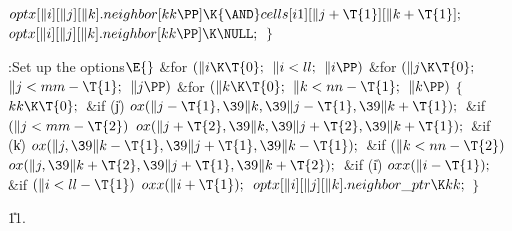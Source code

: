 ${}\\{optx}[\|i][\|j][\|k].\\{neighbor}[\\{kk}\PP]\K{\AND}\\{cells}[\\{i1}][%
\|j+\T{1}][\|k+\T{1}];{}$\6
${}\\{optx}[\|i][\|j][\|k].\\{neighbor}[\\{kk}\PP]\K\NULL;{}$\6
\4${}\}{}$\2\par
\Y\B\4:Set up the  options\X${}\E{}$\6
\&{for} ${}(\|i\K\T{0};{}$ ${}\|i<\\{ll};{}$ ${}\|i\PP){}$\1\6
\&{for} ${}(\|j\K\T{0};{}$ ${}\|j<\\{mm}-\T{1};{}$ ${}\|j\PP){}$\1\6
\&{for} ${}(\|k\K\T{0};{}$ ${}\|k<\\{nn}-\T{1};{}$ ${}\|k\PP){}$\5
${}\{{}$\1\6
${}\\{kk}\K\T{0};{}$\6
\&{if} (\|j)\1\5
${}\\{ox}(\|j-\T{1},\39\|k,\39\|j-\T{1},\39\|k+\T{1});{}$\2\6
\&{if} ${}(\|j<\\{mm}-\T{2}){}$\1\5
${}\\{ox}(\|j+\T{2},\39\|k,\39\|j+\T{2},\39\|k+\T{1});{}$\2\6
\&{if} (\|k)\1\5
${}\\{ox}(\|j,\39\|k-\T{1},\39\|j+\T{1},\39\|k-\T{1});{}$\2\6
\&{if} ${}(\|k<\\{nn}-\T{2}){}$\1\5
${}\\{ox}(\|j,\39\|k+\T{2},\39\|j+\T{1},\39\|k+\T{2});{}$\2\6
\&{if} (\|i)\1\5
${}\\{oxx}(\|i-\T{1});{}$\2\6
\&{if} ${}(\|i<\\{ll}-\T{1}){}$\1\5
${}\\{oxx}(\|i+\T{1});{}$\2\6
${}\\{optx}[\|i][\|j][\|k].\\{neighbor\_ptr}\K\\{kk};{}$\6
\4${}\}{}$\2\2\2\par
\U11.\fi

